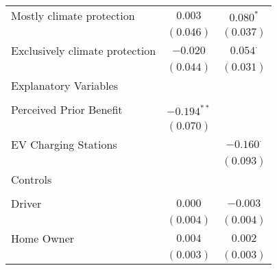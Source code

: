 \begin{center}
\begin{tiny}
\begin{longtable}{l@{} c@{} c@{}}
\quad Mostly climate protection                                                      & $0.003$         & $0.080^{*}$      \\
                                                                                     & $(0.046)$       & $(0.037)$        \\
\quad Exclusively climate protection                                                 & $-0.020$        & $0.054^{\cdot}$  \\
                                                                                     & $(0.044)$       & $(0.031)$        \\
Explanatory Variables                                                                &                 &                  \\
                                                                                     &                 &                  \\
\quad Perceived Prior Benefit                                                        & $-0.194^{**}$   &                  \\
                                                                                     & $(0.070)$       &                  \\
\quad EV Charging Stations                                                           &                 & $-0.160^{\cdot}$ \\
                                                                                     &                 & $(0.093)$        \\
Controls                                                                             &                 &                  \\
                                                                                     &                 &                  \\
\quad Driver                                                                         & $0.000$         & $-0.003$         \\
                                                                                     & $(0.004)$       & $(0.004)$        \\
\quad Home Owner                                                                     & $0.004$         & $0.002$          \\
                                                                                     & $(0.003)$       & $(0.003)$        \\

\end{longtable}
\end{tiny}
\end{center}
